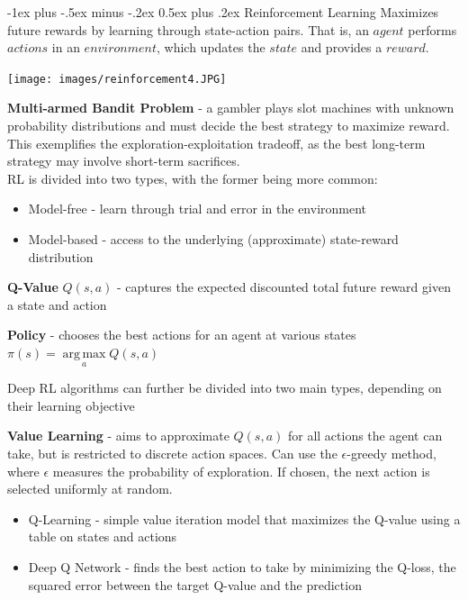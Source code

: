 \documentclass[10pt,landscape]{article}
\makeatletter
\DeclareMathOperator*{\argmax}{arg\,max}
\renewcommand{\section}{\@startsection{section}{1}{0mm}%
                                {-1ex plus -.5ex minus -.2ex}%
                                {0.5ex plus .2ex}%
                                {\normalfont\large\bfseries}}
\makeatother
\begin{document}
\begin{multicols}{3}
\section{Reinforcement Learning}
Maximizes future rewards by learning through state-action pairs. That is, an $agent$ performs $actions$ in an $environment$, which updates the $state$ and provides a $reward$.

\begin{center}
\vspace{-2mm}
    \texttt{[image: images/reinforcement4.JPG]}
\end{center}
\vspace{-2.5mm}
\textbf{Multi-armed Bandit Problem} - a gambler plays slot machines with unknown probability distributions and must decide the best strategy to maximize reward. This exemplifies the exploration-exploitation tradeoff, as the best long-term strategy may involve short-term sacrifices.\\
\smallskip
RL is divided into two types, with the former being more common:
\begin{itemize}[label={--},leftmargin=4mm]
\itemsep -.4mm
\item Model-free - learn through trial and error in the environment
\item Model-based - access to the underlying (approximate) state-reward distribution
\end{itemize}

\textbf{Q-Value} $Q(s,a)$ - captures the expected discounted total future reward given a state and action

\textbf{Policy} - chooses the best actions for an agent at various states \\
$ \pi(s) = \argmax\limits_a Q(s,a)$\\
\smallskip

Deep RL algorithms can further be divided into two main types, depending on their learning objective

\textbf{Value Learning} - aims to approximate $Q(s,a)$ for all actions the agent can take, but is restricted to discrete action spaces. Can use the $\epsilon$-greedy method, where $\epsilon$ measures the probability of exploration. If chosen, the next action is selected uniformly at random.
\begin{itemize}[label={--},leftmargin=4mm]
\itemsep -.4mm
\item Q-Learning - simple value iteration model that maximizes the Q-value using a table on states and actions
\item Deep Q Network - finds the best action to take by minimizing the Q-loss, the squared error between the target Q-value and the prediction
\end{itemize}


\end{multicols}
\end{document}

